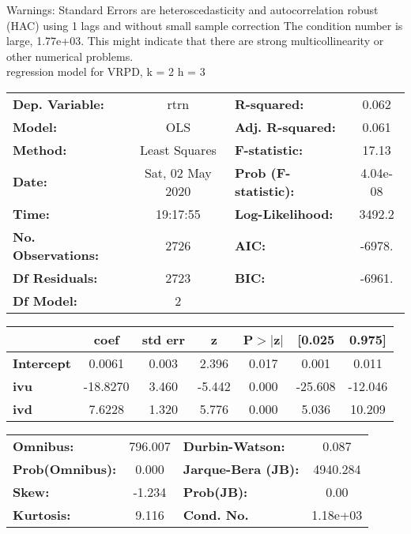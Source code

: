 Warnings: \newline
 [1] Standard Errors are heteroscedasticity and autocorrelation robust (HAC) using 1 lags and without small sample correction \newline
 [2] The condition number is large, 1.77e+03. This might indicate that there are \newline
 strong multicollinearity or other numerical problems.\\ 

regression model for VRPD, k = 2 h = 3\begin{center}
\begin{tabular}{lclc}
\toprule
\textbf{Dep. Variable:}    &       rtrn       & \textbf{  R-squared:         } &     0.062   \\
\textbf{Model:}            &       OLS        & \textbf{  Adj. R-squared:    } &     0.061   \\
\textbf{Method:}           &  Least Squares   & \textbf{  F-statistic:       } &     17.13   \\
\textbf{Date:}             & Sat, 02 May 2020 & \textbf{  Prob (F-statistic):} &  4.04e-08   \\
\textbf{Time:}             &     19:17:55     & \textbf{  Log-Likelihood:    } &    3492.2   \\
\textbf{No. Observations:} &        2726      & \textbf{  AIC:               } &    -6978.   \\
\textbf{Df Residuals:}     &        2723      & \textbf{  BIC:               } &    -6961.   \\
\textbf{Df Model:}         &           2      & \textbf{                     } &             \\
\bottomrule
\end{tabular}
\begin{tabular}{lcccccc}
                   & \textbf{coef} & \textbf{std err} & \textbf{z} & \textbf{P$> |$z$|$} & \textbf{[0.025} & \textbf{0.975]}  \\
\midrule
\textbf{Intercept} &       0.0061  &        0.003     &     2.396  &         0.017        &        0.001    &        0.011     \\
\textbf{ivu}       &     -18.8270  &        3.460     &    -5.442  &         0.000        &      -25.608    &      -12.046     \\
\textbf{ivd}       &       7.6228  &        1.320     &     5.776  &         0.000        &        5.036    &       10.209     \\
\bottomrule
\end{tabular}
\begin{tabular}{lclc}
\textbf{Omnibus:}       & 796.007 & \textbf{  Durbin-Watson:     } &    0.087  \\
\textbf{Prob(Omnibus):} &   0.000 & \textbf{  Jarque-Bera (JB):  } & 4940.284  \\
\textbf{Skew:}          &  -1.234 & \textbf{  Prob(JB):          } &     0.00  \\
\textbf{Kurtosis:}      &   9.116 & \textbf{  Cond. No.          } & 1.18e+03  \\
\bottomrule
\end{tabular}
\end{center}


